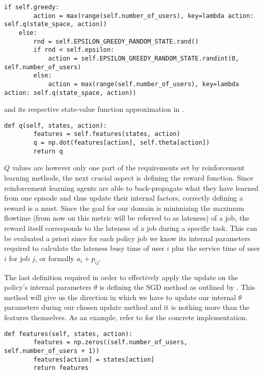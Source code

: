 \documentclass{seal_thesis}
\begin{document}
\begin{lstlisting}[caption=Epsilon greedy approach,label=lst:e_greedy,style=CustomPython]
    if self.greedy:
        action = max(range(self.number_of_users), key=lambda action: self.q(state_space, action))
    else:
        rnd = self.EPSILON_GREEDY_RANDOM_STATE.rand()
        if rnd < self.epsilon:
            action = self.EPSILON_GREEDY_RANDOM_STATE.randint(0, self.number_of_users)
        else:
            action = max(range(self.number_of_users), key=lambda action: self.q(state_space, action))
\end{lstlisting}

and its respective state-value function approximation in .

\begin{lstlisting}[caption=State-value function approximation,label=lst:value_f_approx,style=CustomPython]
    def q(self, states, action):
        features = self.features(states, action)
        q = np.dot(features[action], self.theta[action])
        return q
\end{lstlisting}
 
 $Q$ values are however only one part of the requirements set by reinforcement learning methods, the next crucial aspect is defining the reward function. Since reinforcement learning agents are able to back-propagate what they have learned from one episode and thus update their internal factors, correctly defining a reward is a must. Since the goal for our domain is minimizing the maximum flowtime (from now on this metric will be referred to as lateness) of a job, the reward itself corresponds to the lateness of a job during a specific task. This can be evaluated a priori since for each policy job we know its internal parameters required to calculate the lateness \ie busy time of user $i$ plus the service time of user $i$ for job $j$, or formally $a_i+p_{ij}$.

 The last definition required in order to effectively apply the update on the policy's internal parameters $\theta$ is defining the SGD method as outlined by . This method will give us the direction in which we have to update our internal $\theta$ parameters during our chosen update method and it is nothing more than the features themselves. As an example, refer to  for the concrete implementation.

 \begin{lstlisting}[caption=Features definition,label=lst:features_definition,style=CustomPython]
    def features(self, states, action):
        features = np.zeros((self.number_of_users, self.number_of_users + 1))
        features[action] = states[action]
        return features
\end{lstlisting}
\end{document}
